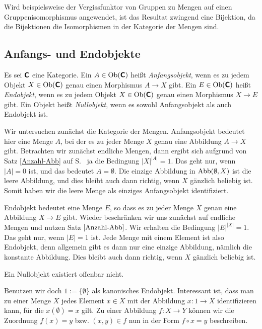 Wird beispielsweise der Vergissfunktor von Gruppen zu Mengen auf
einen Gruppenisomorphismus angewendet, ist das Resultat zwingend
eine Bijektion, da die Bijektionen die Isomorphismen in der Kategorie
der Mengen sind.

\subsection{Anfangs- und Endobjekte}

\begin{Definition}\newlinefirst
Es sei $\textsf{\textbf{C}}$ eine Kategorie. Ein
$A\in\operatorname{Ob}(\textsf{\textbf{C}})$ heißt \emph{Anfangsobjekt}, wenn
es zu jedem Objekt $X\in\operatorname{Ob}(\textsf{\textbf{C}})$ genau einen
Morphismus $A\to X$ gibt.
Ein $E\in\operatorname{Ob}(\textsf{\textbf{C}})$ heißt \emph{Endobjekt}, wenn
es zu jedem Objekt $X\in\operatorname{Ob}(\textsf{\textbf{C}})$ genau einen
Morphismus $X\to E$ gibt. Ein Objekt heißt \emph{Nullobjekt}, wenn
es sowohl Anfangsobjekt als auch Endobjekt ist.
\end{Definition}

\noindent
{}
Wir untersuchen zunächst die Kategorie der Mengen. Anfangsobjekt
bedeutet hier eine Menge $A$, bei der es zu jeder Menge $X$ genau
eine Abbildung $A\to X$ gibt. Betrachten wir zunächst endliche
Mengen, dann ergibt sich aufgrund von Satz \ref{Anzahl-Abb} auf
S.~\pageref{Anzahl-Abb} ja die Bedingung $|X|^{|A|}=1$. Das geht nur,
wenn $|A|=0$ ist,
und das bedeutet $A=\emptyset$. Die einzige Abbildung in $\operatorname{Abb}(\emptyset,X)$
ist die leere Abbildung, und dies bleibt auch dann richtig, wenn
$X$ gänzlich beliebig ist. Somit haben wir die leere Menge als
einziges Anfangsobjekt identifiziert.

Endobjekt bedeutet eine Menge $E$, so dass es zu jeder Menge $X$
genau eine Abbildung $X\to E$ gibt. Wieder beschränken wir uns
zunächst auf endliche Mengen und nutzen Satz $\ref{Anzahl-Abb}$.
Wir erhalten die Bedingung $|E|^{|X|}=1$. Das geht nur, wenn
$|E|=1$ ist. Jede Menge mit einem Element ist also Endobjekt,
denn allgemein gibt es dann nur eine einzige Abbildung, nämlich
die konstante Abbildung. Dies bleibt auch dann richtig, wenn
$X$ gänzlich beliebig ist.

Ein Nullobjekt existiert offenbar nicht.

Benutzen wir doch $1:=\{\emptyset\}$ als kanonisches Endobjekt.
Interessant ist, dass man zu einer Menge $X$ jedes Element
$x\in X$ mit der Abbildung $x\colon 1\to X$ identifizieren kann,
für die $x(\emptyset)=x$ gilt. Zu einer Abbildung $f\colon X\to Y$
können wir die Zuordnung $f(x)=y$ bzw. $(x,y)\in f$ nun in der Form
$f\circ x = y$ beschreiben.

